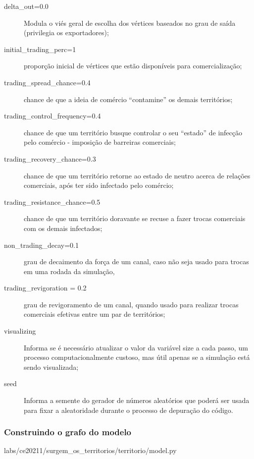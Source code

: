 \begin{description}
\item [delta\_out=0.0] Modula o viés geral de escolha dos vértices baseados no grau de saída (privilegia os exportadores);
\item [initial\_trading\_perc=1] proporção inicial de vértices que estão disponíveis para comercialização;
\item [trading\_spread\_chance=0.4] chance de que a ideia de comércio ``contamine'' os demais territórios;
\item [trading\_control\_frequency=0.4] chance de que um território busque controlar o seu ``estado'' de infecção pelo comércio - imposição de barreiras comerciais;
\item [trading\_recovery\_chance=0.3] chance de que um território retorne ao estado de neutro acerca de relações comerciais, após ter sido infectado pelo comércio;
\item [trading\_resistance\_chance=0.5] chance de que um território doravante se recuse a fazer trocas comerciais com os demais infectados;
\item [non\_trading\_decay=0.1] grau de decaimento da força de um canal, caso não seja usado para trocas em uma rodada da simulação,
\item [trading\_revigoration = 0.2] grau de revigoramento de um canal, quando usado para realizar trocas comerciais efetivas entre um par de territórios;
\item [visualizing] Informa se é necessário atualizar o valor da variável size a cada passo, um processo computacionalmente custoso, mas útil apenas se a simulação  está sendo visualizada;
\item [seed] Informa a semente do gerador de números aleatórios que poderá ser usada para fixar a aleatoridade durante o processo de depuração do código. 
\end{description}

\subsubsection{Construindo o grafo do modelo}


{labs/ce20211/surgem_os_territorios/territorio/model.py}

